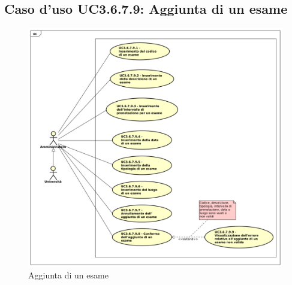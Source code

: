 \subsection{Caso d'uso \texorpdfstring{UC3.6.7.9}{UC3.6.7.9}: Aggiunta di un esame}
\begin{figure} [H]
	\centering
	\includegraphics[scale=0.45]{./img/UC3-6-7-9.pdf}
	\caption{Aggiunta di un esame}\label{}
\end{figure}
